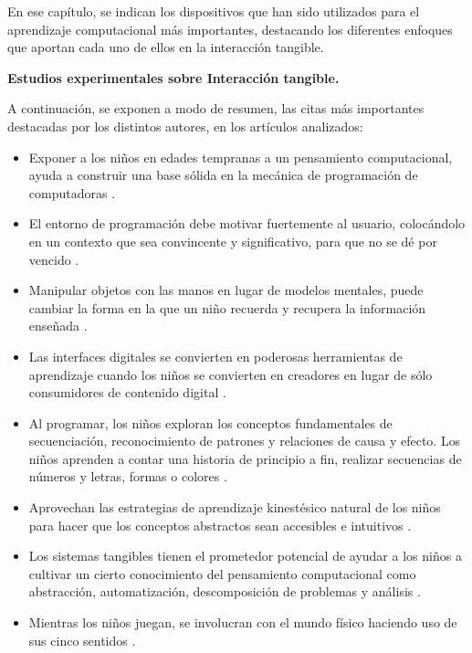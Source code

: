 En ese capítulo, se indican los dispositivos que han sido utilizados para el aprendizaje computacional más importantes, destacando los diferentes enfoques que aportan cada uno de ellos en la interacción tangible.

\textbf{Estudios experimentales sobre Interacción tangible.}

A continuación, se exponen a modo de resumen, las citas más importantes destacadas por los distintos autores, en los artículos analizados:
\begin{itemize}
\item Exponer a los niños en edades tempranas a un pensamiento computacional, ayuda a construir una base sólida en la mecánica de programación de computadoras \cite{Grover}.

\item El entorno de programación debe motivar fuertemente al usuario, colocándolo en un contexto que sea convincente y significativo, para que no se dé por vencido \cite{Ishii}.

\item Manipular objetos con las manos en lugar de modelos mentales, puede cambiar la forma en la que un niño recuerda y recupera la información enseñada \cite{Piaget}.

\item Las interfaces digitales se convierten en poderosas herramientas de aprendizaje cuando los niños se convierten en creadores en lugar de sólo consumidores de contenido digital \cite{Resnick}. 

\item Al programar, los niños exploran los conceptos fundamentales de secuenciación, reconocimiento de patrones y relaciones de causa y efecto. Los niños aprenden a contar una historia de principio a fin, realizar secuencias de números y letras, formas o colores \cite{Kazakoff}.

\item Aprovechan las estrategias de aprendizaje kinestésico natural de los niños para hacer que los conceptos abstractos sean accesibles e intuitivos \cite{Xu}. 

\item Los sistemas tangibles tienen el prometedor potencial de ayudar a los niños a cultivar un cierto conocimiento del pensamiento computacional como abstracción, automatización, descomposición de problemas y análisis \cite{Wang_2015}.

\item Mientras los niños juegan, se involucran con el mundo físico haciendo uso de sus cinco sentidos \cite{Vygotsky}.


\end{itemize}

